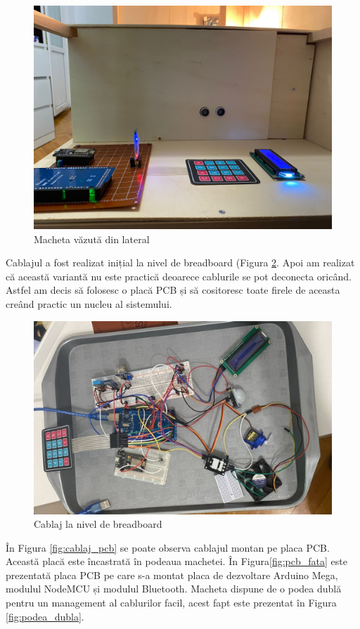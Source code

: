 \begin{figure}[H]
\includegraphics[width=0.6\linewidth]{bachelors_ro/images/casa_din_lateral.jpg}
\caption{Macheta văzută din lateral}
\label{fig:casa_din_lateral}
\end{figure}

Cablajul a fost realizat inițial la nivel de breadboard (Figura \ref{fig:cablaj_breadboard}. Apoi am realizat că această variantă nu este practică deoarece cablurile se pot deconecta oricând. Astfel am decis să folosesc o placă PCB și să cositoresc toate firele de aceasta creând practic un nucleu al sistemului.

\begin{figure}[H]
\includegraphics[width=0.6\linewidth]{bachelors_ro/images/cablaj_breadboard.jpg}
\caption{Cablaj la nivel de breadboard}
\label{fig:cablaj_breadboard}
\end{figure}

În Figura \ref{fig:cablaj_pcb} se poate observa cablajul montan pe placa PCB. Această placă este încastrată în podeaua machetei. În Figura\ref{fig:pcb_fata} este prezentată placa PCB pe care s-a montat placa de dezvoltare Arduino Mega, modulul NodeMCU și modulul Bluetooth. Macheta dispune de o podea dublă pentru un management al cablurilor facil, acest fapt este prezentat în Figura \ref{fig:podea_dubla}.

